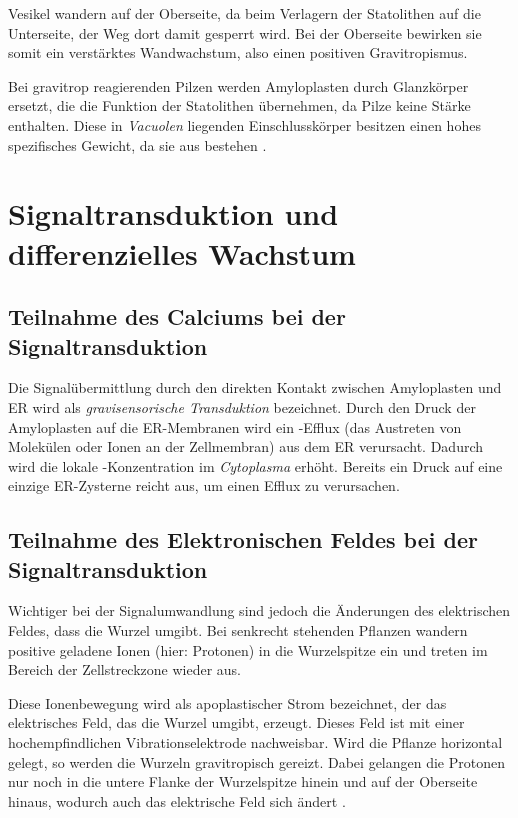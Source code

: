 \documentclass[
a4paper, 
11pt, 
ngerman,
listof=totoc,
bibliography=totocnumbered,
abstracton
]{scrreprt}
\begin{document}
Vesikel wandern auf der Oberseite, da beim Verlagern der Statolithen auf die Unterseite, der Weg dort damit gesperrt wird. Bei der Oberseite bewirken sie somit ein verstärktes Wandwachstum, also einen positiven Gravitropismus.

Bei gravitrop reagierenden Pilzen werden Amyloplasten durch {\glqq Glanzkörper\grqq} ersetzt, die die Funktion der Statolithen übernehmen, da Pilze keine Stärke enthalten. Diese in \emph{Vacuolen} liegenden Einschlusskörper besitzen einen hohes spezifisches Gewicht, da sie aus  bestehen \parencite[453f]{Strasburger}.




\section{Signaltransduktion und differenzielles Wachstum}

\subsection{Teilnahme des Calciums bei der Signaltransduktion}

Die Signalübermittlung durch den direkten Kontakt zwischen Amyloplasten und ER wird als \emph{gravisensorische Transduktion} bezeichnet.
Durch den Druck der Amyloplasten auf die ER-Membranen wird ein -Efflux (das Austreten von Molekülen oder Ionen an der Zellmembran) aus dem ER verursacht.
Dadurch wird die lokale -Konzentration im  \emph{Cytoplasma} erhöht. 
Bereits ein Druck auf eine einzige ER-Zysterne reicht aus, um einen Efflux zu verursachen.

\subsection{Teilnahme des Elektronischen Feldes bei der Signaltransduktion}

Wichtiger bei der Signalumwandlung sind jedoch die Änderungen des elektrischen Feldes, dass die Wurzel umgibt.
Bei senkrecht stehenden Pflanzen wandern positive geladene Ionen (hier: Protonen) in die Wurzelspitze ein und treten im Bereich der Zellstreckzone wieder aus.

Diese Ionenbewegung wird als apoplastischer Strom bezeichnet, der das elektrisches Feld, das die Wurzel umgibt, erzeugt. Dieses Feld ist mit einer hochempfindlichen Vibrationselektrode nachweisbar. 
Wird die Pflanze horizontal gelegt, so werden die Wurzeln gravitropisch gereizt. Dabei gelangen die Protonen nur noch in die untere Flanke der Wurzelspitze hinein und auf der Oberseite hinaus, wodurch auch das elektrische Feld sich ändert \parencite[502f]{Nultsch}.
\end{document}
